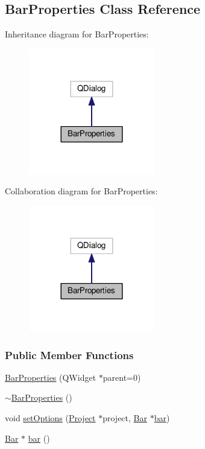 \hypertarget{class_bar_properties}{}\subsection{Bar\+Properties Class Reference}
\label{class_bar_properties}


Inheritance diagram for Bar\+Properties\+:\nopagebreak
\begin{figure}[H]
\begin{center}
\leavevmode
\includegraphics[width=156pt]{class_bar_properties__inherit__graph}
\end{center}
\end{figure}


Collaboration diagram for Bar\+Properties\+:\nopagebreak
\begin{figure}[H]
\begin{center}
\leavevmode
\includegraphics[width=156pt]{class_bar_properties__coll__graph}
\end{center}
\end{figure}
\subsubsection*{Public Member Functions}
\begin{DoxyCompactItemize}
\item 
\hyperlink{class_bar_properties_a7c14a54f430cabfe872869799076025b}{Bar\+Properties} (Q\+Widget $\ast$parent=0)
\item 
\hyperlink{class_bar_properties_a639b4da849970025a2935ee965d6a465}{$\sim$\+Bar\+Properties} ()
\item 
void \hyperlink{class_bar_properties_a80cba99404820272603c4da8fb708c05}{set\+Options} (\hyperlink{class_project}{Project} $\ast$project, \hyperlink{class_bar}{Bar} $\ast$\hyperlink{class_bar_properties_a65d09e7315764cd4ad33b5a0ded32090}{bar})
\item 
\hyperlink{class_bar}{Bar} $\ast$ \hyperlink{class_bar_properties_a65d09e7315764cd4ad33b5a0ded32090}{bar} ()
\end{DoxyCompactItemize}


